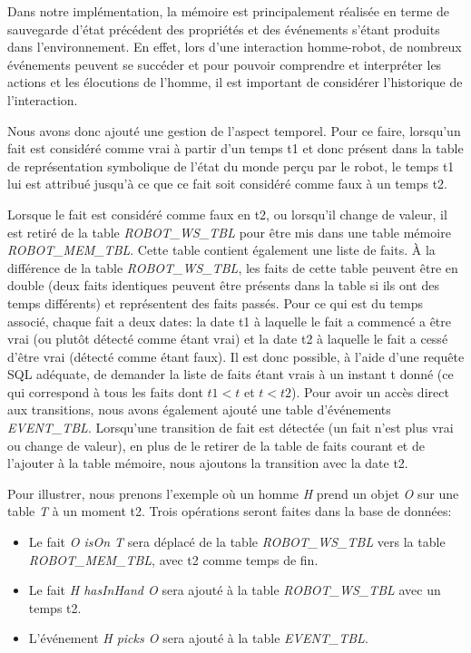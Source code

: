 \documentclass[a4paper,11pt,twoside]{StyleThese}
\begin{document}
Dans notre implémentation, la mémoire est principalement réalisée en terme de sauvegarde d'état précédent des propriétés et des événements s'étant produits dans l'environnement.
En effet, lors d'une interaction homme-robot, de nombreux événements peuvent se succéder et pour pouvoir comprendre et interpréter les actions et les élocutions de l'homme, il est important de considérer l'historique de l'interaction.

Nous avons donc ajouté une gestion de l'aspect temporel.
Pour ce faire, lorsqu'un fait est considéré comme vrai à partir d'un temps t1 et donc présent dans la table de représentation symbolique de l'état du monde perçu par le robot, le temps t1 lui est attribué jusqu'à ce que ce fait soit considéré comme faux à un temps t2.

Lorsque le fait est considéré comme faux en t2, ou lorsqu'il change de valeur, il est retiré de la table \textit{ROBOT\_WS\_TBL} pour être mis dans une table mémoire \textit{ROBOT\_MEM\_TBL}. Cette table contient également une liste de faits. À la différence de la table \textit{ROBOT\_WS\_TBL}, les faits de cette table peuvent être en double (deux faits identiques peuvent être présents dans la table si ils ont des temps différents) et représentent des faits passés. Pour ce qui est du temps associé, chaque fait a deux dates: la date t1 à laquelle le fait a commencé a être vrai (ou plutôt détecté comme étant vrai) et la date t2 à laquelle le fait a cessé d'être vrai (détecté comme étant faux).
Il est donc possible, à l'aide d'une requête SQL adéquate, de demander la liste de faits étant vrais à un instant t donné (ce qui correspond à tous les faits dont $t1 < t$ et $t < t2$).
Pour avoir un accès direct aux transitions, nous avons également ajouté une table d'événements \textit{EVENT\_TBL}. Lorsqu'une transition de fait est détectée (un fait n'est plus vrai ou change de valeur), en plus de le retirer de la table de faits courant et de l'ajouter à la table mémoire, nous ajoutons la transition avec la date t2. 

Pour illustrer, nous prenons l'exemple où un homme \textit{H} prend un objet \textit{O} sur une table \textit{T} à un moment t2. Trois opérations seront faites dans la base de données:

\begin{itemize}
\item Le fait \textit{O isOn T} sera déplacé de la table \textit{ROBOT\_WS\_TBL} vers la table \textit{ROBOT\_MEM\_TBL}, avec t2 comme temps de fin.
\item Le fait  \textit{H hasInHand O} sera ajouté à la table \textit{ROBOT\_WS\_TBL} avec un temps t2.
\item L'événement \textit{H picks O} sera ajouté à la table \textit{EVENT\_TBL}.
\end{itemize}
\end{document}
